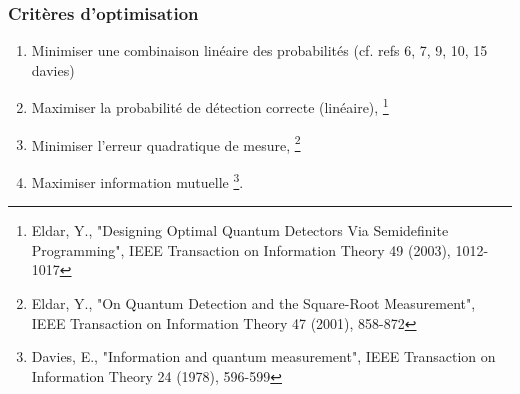 \documentclass{beamer}
\begin{document}
\begin{frame}
    \frametitle{Critères d'optimisation}
    \begin{enumerate}
        \item Minimiser une combinaison linéaire des probabilités (cf. refs 6, 7, 9, 10, 15 davies)
        \item Maximiser la probabilité de détection correcte (linéaire), \footnote{\tiny Eldar, Y., "Designing Optimal Quantum Detectors Via Semidefinite Programming", IEEE Transaction on Information Theory 49 (2003), 1012-1017}
        \item Minimiser l'erreur quadratique de mesure, \footnote{\tiny Eldar, Y., "On Quantum Detection and the Square-Root Measurement", IEEE Transaction on Information Theory 47 (2001), 858-872}
        \item Maximiser information mutuelle \footnote{\tiny Davies, E., "Information and quantum measurement", IEEE Transaction on Information Theory 24 (1978), 596-599}.
    \end{enumerate}
\end{frame}
\end{document}
